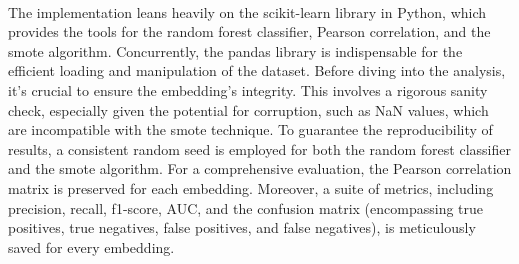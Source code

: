 \paragraph{}The implementation leans heavily on the scikit-learn library \cite{pedregosa_scikit-learn_2011} in Python, which provides the tools for the random forest classifier, Pearson correlation, and the \gls{smote} algorithm. Concurrently, the pandas library is indispensable for the efficient loading and manipulation of the dataset. Before diving into the analysis, it's crucial to ensure the embedding's integrity. This involves a rigorous sanity check, especially given the potential for corruption, such as NaN values, which are incompatible with the \gls{smote} technique. To guarantee the reproducibility of results, a consistent random seed is employed for both the random forest classifier and the \gls{smote} algorithm. For a comprehensive evaluation, the Pearson correlation matrix is preserved for each embedding. Moreover, a suite of metrics, including precision, recall, f1-score, AUC, and the confusion matrix (encompassing true positives, true negatives, false positives, and false negatives), is meticulously saved for every embedding.
